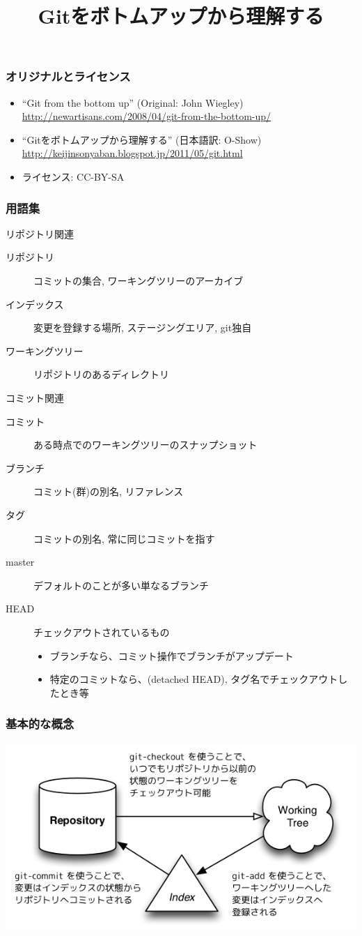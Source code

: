 \title{Gitをボトムアップから理解する}



\begin{frame}
  \titlepage
\end{frame}

\begin{frame}
  \frametitle{オリジナルとライセンス}
  \begin{itemize}
  \item ``Git from the bottom up'' (Original: John Wiegley)\\
    \url{http://newartisans.com/2008/04/git-from-the-bottom-up/}
  \item ``Gitをボトムアップから理解する'' (日本語訳: O-Show)\\
    \url{http://keijinsonyaban.blogspot.jp/2011/05/git.html}
  \item ライセンス: CC-BY-SA
  \end{itemize}
\end{frame}

\begin{frame}
  \frametitle{用語集}
  リポジトリ関連
  \begin{description}
  \item[リポジトリ] コミットの集合, ワーキングツリーのアーカイブ
  \item[インデックス] 変更を登録する場所, ステージングエリア, \alert{git独自}
  \item[ワーキングツリー] リポジトリのあるディレクトリ
  \end{description}
  コミット関連
  \begin{description}
  \item[コミット] ある時点でのワーキングツリーのスナップショット
  \item[ブランチ] \alert{コミット(群)の別名}, リファレンス
  \item[タグ] \alert{コミットの別名}, 常に同じコミットを指す
  \item[master] デフォルトのことが多い\alert{単なるブランチ}
  \item[HEAD] チェックアウトされているもの
    \begin{itemize}
    \item ブランチなら、コミット操作でブランチがアップデート
    \item 特定のコミットなら、(detached HEAD), タグ名でチェックアウトしたとき等
    \end{itemize}
  \end{description}
\end{frame}

\begin{frame}
  \frametitle{基本的な概念}
  \begin{center}
    \includegraphics[height=.6\textheight]{4_ja.png}
  \end{center}
\end{frame}


